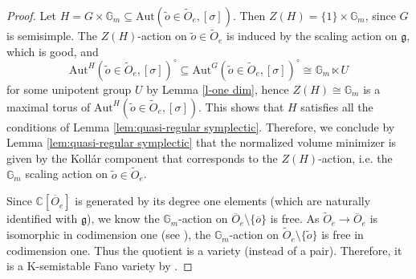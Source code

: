 \documentclass[12pt]{amsart}
\theoremstyle{definition}
\newcommand{\bR}{\mathbb{R}}
\newcommand{\bT}{\mathbb{T}}
\newcommand{\bG}{\mathbb{G}}
\newcommand{\ft}{\mathfrak{t}}
\newcommand{\fg}{\mathfrak g}
\newcommand{\Aut}{\mathrm{Aut}}
\numberwithin{equation}{section}
\begin{document}
\begin{proof}
Let $H=G\times \bG_m\subseteq \Aut(\tilde{o} \in \widetilde{O}_e,[\sigma])$. Then $Z(H)=\{1\}\times \bG_m$, since $G$ is semisimple. The $Z(H)$-action on $\tilde{o} \in \widetilde{O}_e$ is induced by the scaling action on $\fg$, which is good, and 
\[
\Aut^H(\tilde{o} \in \widetilde{O}_e,[\sigma])^\circ\subseteq \Aut^G(\tilde{o} \in \widetilde{O}_e,[\sigma])^\circ \cong \bG_m\ltimes U
\]
for some unipotent group $U$ by Lemma \ref{l-one dim}, hence $Z(H)\cong \bG_m$ is a maximal torus of $\Aut^H(\tilde{o} \in \widetilde{O}_e,[\sigma])$. This shows that $H$ satisfies all the conditions of Lemma \ref{lem:quasi-regular symplectic}. Therefore, we conclude by Lemma \ref{lem:quasi-regular symplectic} that the normalized volume minimizer is given by the Koll\'ar component that corresponds to the $Z(H)$-action, i.e. the $\bG_m$ scaling action on $\tilde{o} \in \widetilde{O}_e$.



Since  $\mathbb{C}[\overline{O}_e]$ is generated by its degree one elements  (which are naturally identified with $\fg$), we know the $\mathbb{G}_m$-action on $\overline{O}_e\setminus \{\overline{o}\}$ is free. As $\widetilde{O}_e\to \overline{O}_e$ is isomorphic in codimension one (see \cite[Proposition 1.2]{BK-nilpotent}), the $\mathbb{G}_m$-action on $\widetilde{O}_e\setminus \{\tilde{o}\}$ is free in codimension one. Thus the quotient is a variety (instead of a pair). Therefore, it is a K-semistable Fano variety by \cite{LX-Kol-comp-stab}.
\end{proof}
\end{document}
